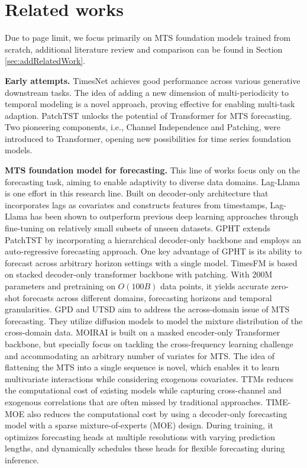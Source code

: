 \section{Related works}
\label{related}

Due to page limit, we focus primarily on MTS foundation models trained from scratch, 
additional literature review and comparison can be found in Section \ref{sec:addRelatedWork}.  

   

 

{\bf Early attempts.}  
TimesNet\cite{Wu23} achieves good performance across various generative downstream tasks.
The idea of adding a new dimension of multi-periodicity to 
temporal modeling is a novel approach, proving effective for enabling multi-task adaption.  
PatchTST\cite{Nie23} unlocks the potential of 
Transformer for MTS forecasting.   
Two pioneering components, 
i.e., Channel Independence and Patching, 
were introduced to Transformer, 
opening new possibilities for 
time series foundation models.    

{\bf MTS foundation model for forecasting.} 
This line of works focus only on the forecasting task, 
aiming to enable adaptivity to diverse data domains.  
Lag-Llama\cite{Rasul23} is one effort in this research line. Built on decoder-only architecture that incorporates lags as covariates and constructs features from timestamps, Lag-Llama has been shown to outperform previous deep learning approaches through fine-tuning on relatively small subsets of unseen datasets.  
GPHT\cite{Liuzd24} extends PatchTST by incorporating a hierarchical decoder-only backbone and employs an auto-regressive forecasting approach. One key advantage of GPHT is its ability to forecast across arbitrary horizon settings with a single model.  
TimesFM \cite{Das24} is based on stacked decoder-only 
transformer backbone with patching.  
With 200M parameters and pretraining on $O(100B)$ data points, 
it yields accurate zero-shot forecasts  
across different domains, 
forecasting horizons and temporal granularities.  
GPD\cite{Yang24} and UTSD \cite{Ma24} 
aim to address the across-domain issue of 
MTS forecasting. 
They utilize diffusion models to model 
the mixture distribution of the cross-domain data. 
MOIRAI \cite{Woo24} is built on a masked encoder-only Transformer backbone, but specially focus on 
tackling the cross-frequency learning challenge and 
accommodating an arbitrary number
of variates for MTS. 
The idea of flattening the MTS into a single sequence is novel, 
which enables it to learn multivariate interactions while considering exogenous covariates.   
TTMs \cite{Ekambaram24} reduces the computational cost of existing models while capturing cross-channel and exogenous correlations that are often missed by traditional approaches. 
TIME-MOE\cite{Shi24} also reduces the 
computational cost by using a decoder-only forecasting model with a sparse mixture-of-experts (MOE) design. During training, it optimizes forecasting heads at multiple resolutions with varying prediction lengths, and dynamically schedules these heads for flexible forecasting during inference.  

